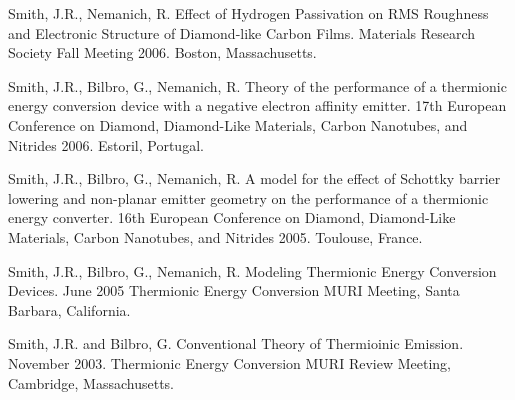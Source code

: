 \documentclass[letterpaper,margin,line]{res}
\begin{document}
\begin{resume}
Smith, J.R., Nemanich, R. Effect of Hydrogen Passivation on RMS Roughness and Electronic Structure of Diamond-like Carbon Films. Materials Research Society Fall Meeting 2006. Boston, Massachusetts.

Smith, J.R., Bilbro, G., Nemanich, R. Theory of the performance of a thermionic energy conversion device with a negative electron affinity emitter. 17th European Conference on Diamond, Diamond-Like Materials, Carbon Nanotubes, and Nitrides 2006. Estoril, Portugal.


Smith, J.R., Bilbro, G., Nemanich, R. A model for the effect of Schottky barrier lowering and non-planar emitter geometry on the performance of a thermionic energy converter. 16th European Conference on Diamond, Diamond-Like Materials, Carbon Nanotubes, and Nitrides 2005. Toulouse, France.

Smith, J.R., Bilbro, G., Nemanich, R. Modeling Thermionic Energy Conversion Devices. June 2005 Thermionic Energy Conversion MURI Meeting, Santa Barbara, California.

Smith, J.R. and Bilbro, G. Conventional Theory of Thermioinic Emission. November 2003. Thermionic Energy Conversion MURI Review Meeting, Cambridge, Massachusetts.


\end{resume}
\end{document}
